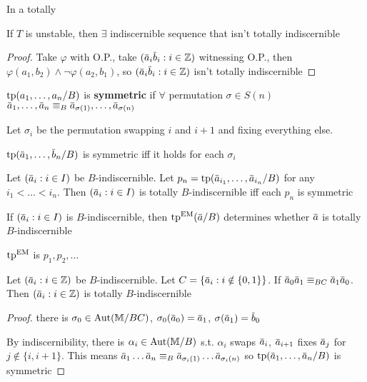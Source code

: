 \documentclass[11pt]{article}
\begin{document}
In a totally

\begin{proposition}[]
If \(T\) is unstable, then \(\exists\) indiscernible sequence that isn't totally indiscernible
\end{proposition}

\begin{proof}
Take \(\varphi\) with O.P., take \((\bara_i\barb_i:i\in\Z)\) witnessing O.P., then \(\varphi(a_1,b_2)\wedge\neg\varphi(a_2,b_1)\),
so \((\bara_i\barb_i:i\in\Z)\) isn't totally indiscernible
\end{proof}

\begin{definition}[]
\(\operatorname{tp}(a_1,\dots,a_n/B)\) is \textbf{symmetric} if \(\forall\) permutation \(\sigma\in S(n)\)
\(\bara_1,\dots,\bara_n\equiv_B\bara_{\sigma(1)},\dots,\bara_{\sigma(n)}\)
\end{definition}

\begin{remark}
Let \(\sigma_i\) be the permutation swapping \(i\) and \(i+1\) and fixing everything else.

\(\tp(\bara_1,\dots,\barb_n/B)\) is symmetric iff it holds for each \(\sigma_i\)
\end{remark}

\begin{remark}
Let \((\bara_i:i\in I)\) be \(B\)-indiscernible. Let \(p_n=\tp(\bara_{i_1},\dots,\bara_{i_n}/B)\) for
any \(i_1<\dots<i_n\). Then \((\bara_i:i\in I)\) is totally \(B\)-indiscernible iff each \(p_n\) is symmetric
\end{remark}

\begin{remark}
If \((\bara_i:i\in I)\) is \(B\)-indiscernible, then \(\tp^{\EM}(\bara/B)\) determines
whether \(\bara\) is totally \(B\)-indiscernible

\(\operatorname{tp}^{\operatorname{EM}}\) is \(p_1,p_2,\dots\)
\end{remark}

\begin{lemma}[]
Let \((\bara_i:i\in\Z)\) be \(B\)-indiscernible. Let \(C=\{\bara_i:i\notin\{0,1\}\}\).
If \(\bara_0\bara_1\equiv_{BC}\bara_1\bara_0\). Then \((\bara_i:i\in\Z)\) is totally \(B\)-indiscernible
\end{lemma}

\begin{proof}
there is \(\sigma_0\in\operatorname{\text{Aut}}(\mathbb{M}/BC)\), \(\sigma_0(\bara_0)=\bara_1\), \(\sigma(\bara_1)=\barb_0\)

By indiscernibility, there is \(\alpha_i\in\operatorname{\text{Aut}}(\mathbb{M}/B)\) s.t. \(\alpha_i\) swaps \(\bara_i\), \(\bara_{i+1}\)
fixes \(\bara_j\) for \(j\notin\{i,i+1\}\). This means \(\bara_1\dots\bara_n\equiv_B\bara_{\sigma_i(1)}\dots\bara_{\sigma_i(n)}\)
so \(\tp(\bara_1,\dots,\bara_n/B)\) is symmetric
\end{proof}
\end{document}
